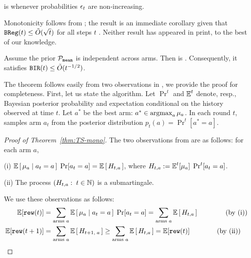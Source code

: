 \begin{corollary}\label{cor:mono-eps-greedy}
\DynamicEpsGreedy is \bmonotone whenever probabilities $\epsilon_t$ are non-increasing.
\end{corollary}

Monotonicity follows from \citet{Selke-BE-2020}; the \BIR result is an immediate corollary given that
    $\mathtt{BReg}(t) \leq \tilde{O}(\sqrt{t})$
for all steps $t$ \citep{Russo-MathOR-14}. Neither result has appeared in print, to the best of our knowledge.

\begin{theorem}\label{thm:TS-mono}
Assume the prior $\mathcal{P}_\mathtt{mean}$ is independent across arms. Then \Thompson is \bmonotone. Consequently, it satisfies $\mathtt{BIR}(t)\leq \tilde{O}(t^{-1/2})$.
\end{theorem}


The theorem follows easily from two observations in  \citet{Selke-BE-2020}, we provide the proof for completeness. First, let us state the algorithm. Let $\Pr^t$ and $\E^t$ denote, resp., Bayesian posterior probability and expectation conditional on the history observed at time $t$. Let $a^*$ be the best arm: $a^*\in \argmax_a \mu_a$. In each round $t$, \Thompson samples arm $a_t$ from the posterior distribution $p_t(a) = {\Pr}^t[a^*=a]$.

\begin{proof}[Proof of Theorem~\ref{thm:TS-mono}]
The two observations from \citet{Selke-BE-2020}  are as follows: for each arm $a$,
\begin{OneLiners}
\item[(i)]
$\E\sbr{ \mu_a \mid a_t = a} \;\Pr[a_t=a] = \E\sbr{H_{t,a}}$,
where
    $H_{t,a} := \E^t[\mu_a]\; \Pr^t[a_t = a]$.

\item[(ii)]
The process $(H_{t,a}:\;t\in\mathbb{N})$
is a submartingale.
\end{OneLiners}

We use these observations as follows:
\begin{align*}
\E[\rew(t)]
    &= \sum_{\text{arms $a$}}
        \E\sbr{ \mu_a \mid a_t = a} \;\Pr[a_t=a]
    =\sum_{\text{arms $a$}}  \E\sbr{ H_{t,a} }
    \qquad\EqComment{by (i)}\\
\E[\rew(t+1)]
    &= \sum_{\text{arms $a$}}  \E\sbr{ H_{t+1,\;a} }
    \geq \sum_{\text{arms $a$}}  \E\sbr{ H_{t,a} }
    =\E[\rew(t)]
    \qquad\EqComment{by (ii)} \qedhere
\end{align*}
\end{proof}

